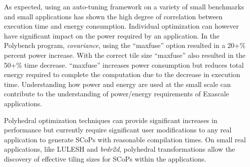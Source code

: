 As expected, using an auto-tuning framework on a variety of
small benchmarks and small applications has shown the high
degree of correlation between execution time and energy
consumption. Individual optimization can however
have significant impact on the power required by an
application. In the Polybench program, \emph{covariance},
using the ``maxfuse'' option resulted in a 20+\% percent power
increase. With the correct tile size ``maxfuse'' also
resulted in the 50+\% time decrease. ``maxfuse'' increases power 
consumption but reduces total energy required to complete the computation due to
the decrease in execution time.
Understanding how power and energy are used at the small
scale can contribute to the understanding of power/energy requirements of Exascale applications.

Polyhedral optimization techniques can provide significant 
increases in performance but currently require 
significant user modifications to any real application
to generate SCoPs with reasonable compilation times.
On small real applications, like LULESH and \emph{brdr2d},
polyhedral transformations allow the discovery of
effective tiling sizes for SCoPs within the applications.

